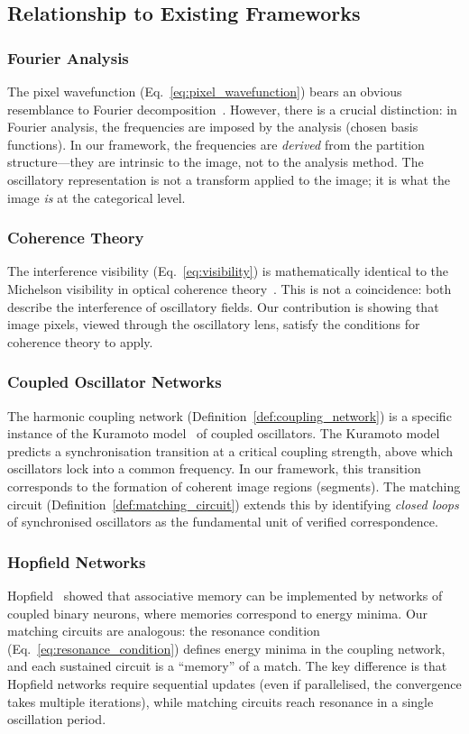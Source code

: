 \documentclass[11pt,twocolumn,a4paper]{article}
\begin{document}
\subsection{Relationship to Existing Frameworks}

\subsubsection{Fourier Analysis}
The pixel wavefunction (Eq.~\eqref{eq:pixel_wavefunction}) bears an obvious resemblance to Fourier decomposition~\citep{fourier1822}. However, there is a crucial distinction: in Fourier analysis, the frequencies are imposed by the analysis (chosen basis functions). In our framework, the frequencies are \emph{derived} from the partition structure---they are intrinsic to the image, not to the analysis method. The oscillatory representation is not a transform applied to the image; it is what the image \emph{is} at the categorical level.

\subsubsection{Coherence Theory}
The interference visibility (Eq.~\eqref{eq:visibility}) is mathematically identical to the Michelson visibility in optical coherence theory~\citep{michelson1891, zernike1938, mandel1965}. This is not a coincidence: both describe the interference of oscillatory fields. Our contribution is showing that image pixels, viewed through the oscillatory lens, satisfy the conditions for coherence theory to apply.

\subsubsection{Coupled Oscillator Networks}
The harmonic coupling network (Definition~\ref{def:coupling_network}) is a specific instance of the Kuramoto model~\citep{kuramoto1975} of coupled oscillators. The Kuramoto model predicts a synchronisation transition at a critical coupling strength, above which oscillators lock into a common frequency. In our framework, this transition corresponds to the formation of coherent image regions (segments). The matching circuit (Definition~\ref{def:matching_circuit}) extends this by identifying \emph{closed loops} of synchronised oscillators as the fundamental unit of verified correspondence.

\subsubsection{Hopfield Networks}
Hopfield~\citep{hopfield1982} showed that associative memory can be implemented by networks of coupled binary neurons, where memories correspond to energy minima. Our matching circuits are analogous: the resonance condition (Eq.~\eqref{eq:resonance_condition}) defines energy minima in the coupling network, and each sustained circuit is a ``memory'' of a match. The key difference is that Hopfield networks require sequential updates (even if parallelised, the convergence takes multiple iterations), while matching circuits reach resonance in a single oscillation period.
\end{document}
